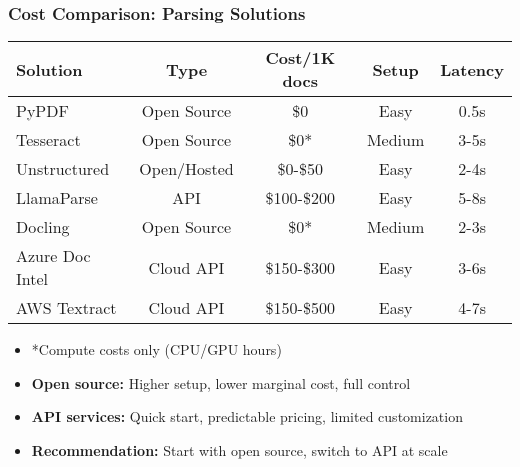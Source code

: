 \begin{frame}[fragile]\frametitle{Cost Comparison: Parsing Solutions}
\begin{table}[h]
\centering
\small
\begin{tabular}{|l|c|c|c|c|}
\hline
\textbf{Solution} & \textbf{Type} & \textbf{Cost/1K docs} & \textbf{Setup} & \textbf{Latency} \\
\hline
PyPDF & Open Source & \$0 & Easy & 0.5s \\
\hline
Tesseract & Open Source & \$0* & Medium & 3-5s \\
\hline
Unstructured & Open/Hosted & \$0-\$50 & Easy & 2-4s \\
\hline
LlamaParse & API & \$100-\$200 & Easy & 5-8s \\
\hline
Docling & Open Source & \$0* & Medium & 2-3s \\
\hline
Azure Doc Intel & Cloud API & \$150-\$300 & Easy & 3-6s \\
\hline
AWS Textract & Cloud API & \$150-\$500 & Easy & 4-7s \\
\hline
\end{tabular}
\end{table}

      \begin{itemize}
        \item *Compute costs only (CPU/GPU hours)
        \item \textbf{Open source:} Higher setup, lower marginal cost, full control
        \item \textbf{API services:} Quick start, predictable pricing, limited customization
        \item \textbf{Recommendation:} Start with open source, switch to API at scale
      \end{itemize}
\end{frame}

